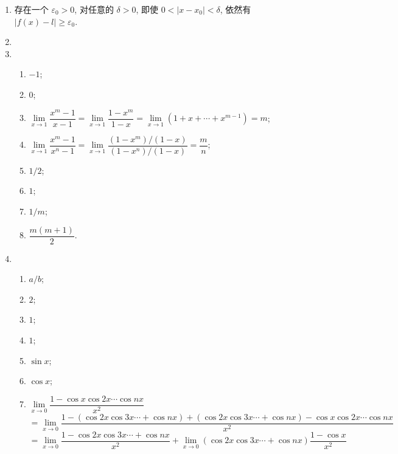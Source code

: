 \begin{enumerate}
    \item %
        存在一个 $\varepsilon_0 > 0$, 对任意的 $\delta > 0$, 即使 $0 < |x - x_0| < \delta$, 依然有 $|f(x) - l| \geqslant \varepsilon_0$.
    \item %
    \item %
        \begin{enumerate}[(1)]
            \item %
                $-1$;
            \item %
                $0$;
            \item %
                $\lim\limits_{x\to1}\dfrac{x^m-1}{x-1} = \lim\limits_{x\to1}\dfrac{1-x^m}{1-x} = \lim\limits_{x\to1}(1 + x + \cdots + x^{m-1}) = m$;
            \item %
                $\lim\limits_{x\to1}\dfrac{x^m-1}{x^n-1} = \lim\limits_{x\to1}\dfrac{(1-x^m)/(1-x)}{(1-x^n)/(1-x)} = \dfrac mn$;
            \item %
                $1/2$;
            \item %
                $1$;
            \item %
                $1/m$;
            \item %
                $\dfrac{m(m+1)}{2}$.
        \end{enumerate}
    \item %
        \begin{enumerate}[(1)]
            \item %
                $a/b$;
            \item %
                $2$;
            \item %
                $1$;
            \item %
                $1$;
            \item %
                $\sin x$;
            \item %
                $\cos x$;
            \item %
                $\lim\limits_{x\to0}\dfrac{1-\cos x\cos 2x\cdots\cos nx}{x^2}$ \\
                $= \lim\limits_{x\to0} \dfrac{1 - (\cos 2x\cos 3x\cdots + \cos nx) + (\cos 2x\cos 3x\cdots + \cos nx) -\cos x\cos 2x\cdots\cos nx}{x^2}$ \\
                $= \lim\limits_{x\to0} \dfrac{1 - \cos 2x\cos 3x\cdots + \cos nx}{x^2} + \lim\limits_{x\to0} (\cos 2x\cos 3x\cdots + \cos nx) \dfrac{1 - \cos x}{x^2}$ \\

\end{enumerate}
\end{enumerate}
